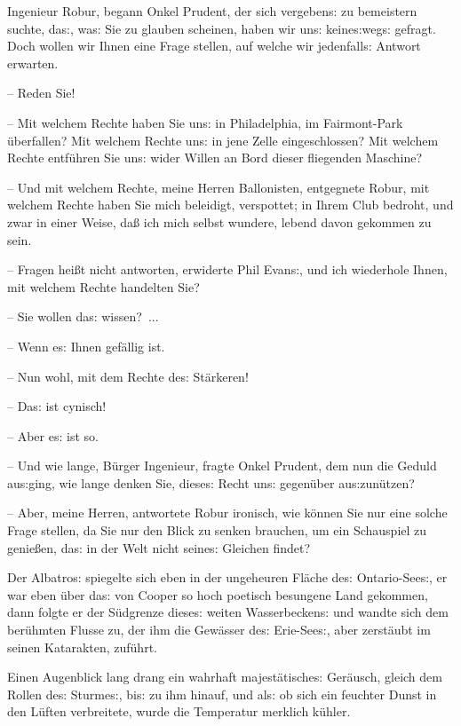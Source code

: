 \documentclass[oneside,12pt]{book}
\newcommand{\s}{s:}
\begin{document}
{\glqq}Ingenieur Robur, begann Onkel Prudent, der sich vergeben{\s}
zu bemeistern suchte, da{\s}, wa{\s} Sie zu glauben scheinen, haben
wir un{\s} keine{\s}weg{\s} gefragt. Doch wollen wir Ihnen eine Frage
stellen, auf welche wir jedenfall{\s} Antwort erwarten.

-- Reden Sie!

-- Mit welchem Rechte haben Sie un{\s} in Philadelphia, im
Fairmont-Park \"uberfallen? Mit welchem Rechte un{\s} in jene Zelle
eingeschlossen? Mit welchem Rechte entf\"uhren Sie un{\s} wider
Willen an Bord dieser fliegenden Maschine?

-- Und mit welchem Rechte, meine Herren Ballonisten, entgegnete
Robur, mit welchem Rechte haben Sie mich beleidigt, verspottet; in
Ihrem Club bedroht, und zwar in einer Weise, da{\ss} ich mich selbst
wundere, lebend davon gekommen zu sein.

-- Fragen hei{\ss}t nicht antworten, erwiderte Phil Evan{\s}, und ich
wiederhole Ihnen, mit welchem Rechte handelten Sie?

-- Sie wollen da{\s} wissen?~...

-- Wenn e{\s} Ihnen gef\"allig ist.

-- Nun wohl, mit dem Rechte de{\s} St\"arkeren!

-- Da{\s} ist cynisch!

-- Aber e{\s} ist so.

-- Und wie lange, B\"urger Ingenieur, fragte Onkel Prudent, dem nun
die Geduld au{\s}ging, wie lange denken Sie, diese{\s} Recht un{\s}
gegen\"uber au{\s}zun\"utzen?

-- Aber, meine Herren, antwortete Robur ironisch, wie k\"onnen Sie
nur eine solche Frage stellen, da Sie nur den Blick zu senken
brauchen, um ein Schauspiel zu genie{\ss}en, da{\s} in der Welt nicht
seine{\s} Gleichen findet?{\grqq}

Der {\glqq}Albatro{\s}{\grqq} spiegelte sich eben in der ungeheuren
Fl\"ache de{\s} Ontario-See{\s}, er war eben \"uber da{\s} von Cooper
so hoch poetisch besungene Land gekommen, dann folgte er der
S\"udgrenze diese{\s} weiten Wasserbecken{\s} und wandte sich dem
ber\"uhmten Flusse zu, der ihm die Gew\"asser de{\s} Erie-See{\s},
aber zerst\"aubt im seinen Katarakten, zuf\"uhrt.

Einen Augenblick lang drang ein wahrhaft majest\"atische{\s}
Ger\"ausch, gleich dem Rollen de{\s} Sturme{\s}, bi{\s} zu ihm
hinauf, und al{\s} ob sich ein feuchter Dunst in den L\"uften
verbreitete, wurde die Temperatur merklich k\"uhler.
\end{document}
